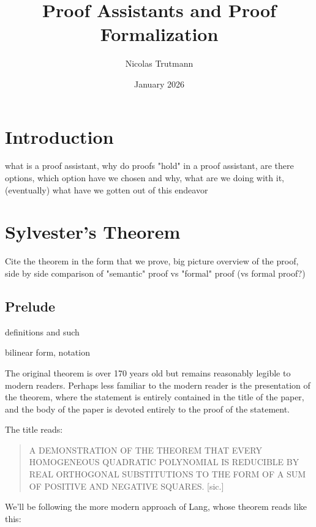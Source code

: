 \documentclass{amsbook}
\title{Proof Assistants and Proof Formalization}
\author{Nicolas Trutmann}
\date{January 2026}
\theoremstyle{definition}
\theoremstyle{remark}
\begin{document}
\maketitle

\tableofcontents

\section{Introduction}\label{sec:introduction} %

\begin{redbox}
  what is a proof assistant, why do proofs "hold" in a proof assistant, are there
  options, which option have we chosen and why, what are we doing with it,
  (eventually) what have we gotten out of this endeavor

  \cite{avigad_foundations_2021}
\end{redbox}


\section{Sylvester's Theorem}\label{sec:sylvester_s_theorem} %

Cite the theorem in the form that we prove, big picture overview of the proof,
side by side comparison of "semantic" proof vs "formal" proof (vs formal
proof?)

\begin{redbox}
  \subsection{Prelude}\label{sec:prelude} %
  definitions and such

  bilinear form, notation
\end{redbox}


\begin{redbox}
  The original theorem is over 170 years old but remains reasonably legible to
  modern readers. Perhaps less familiar to the modern reader is the
  presentation of the theorem, where the statement is entirely contained in the
  title of the paper, and the body of the paper is devoted entirely to the
  proof of the statement.

  The title reads:
  \begin{quotation}
    A DEMONSTRATION OF THE THEOREM THAT EVERY HOMOGENEOUS QUADRATIC POLYNOMIAL
    IS REDUCIBLE BY REAL ORTHOGONAL SUBSTITUTIONS TO THE FORM OF A SUM  OF
    POSITIVE AND NEGATIVE SQUARES. [sic.]
  \end{quotation}



  We'll be following the more modern approach of Lang, whose theorem reads like this:

\end{redbox}
\end{document}
